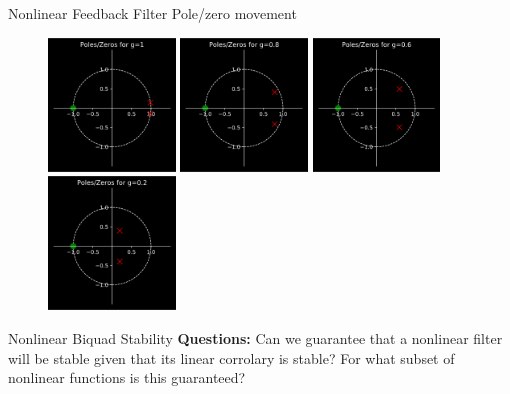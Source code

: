 \begin{frame}{Nonlinear Feedback Filter}
    Pole/zero movement
    \begin{figure}
        \includegraphics[width=1.33in]{../NonlinearFeedback/Pics/pz1.png}
        \includegraphics[width=1.33in]{../NonlinearFeedback/Pics/pz08.png}
        \includegraphics[width=1.33in]{../NonlinearFeedback/Pics/pz06.png}
        \includegraphics[width=1.33in]{../NonlinearFeedback/Pics/pz02.png}
    \end{figure}
\end{frame}

\begin{frame}{Nonlinear Biquad Stability}
    \textbf{Questions:}\newline\newline
    Can we guarantee that a nonlinear filter will be stable
    given that its linear corrolary is stable?
    \newline\newline
    For what subset of nonlinear functions is this guaranteed?
\end{frame}

